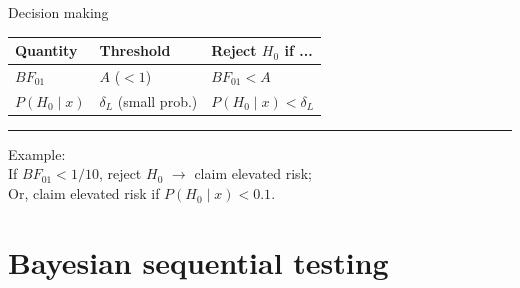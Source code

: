\documentclass[11pt
,fragile=singleslide
,xcolor=dvipsnames
]{beamer}
\begin{document}
	\begin{frame}{Decision making}
		
		\begin{table}
			\centering
			\begin{tabular}{lll}
				\toprule
				Quantity & Threshold & Reject $H_0$ if ... \\
				\midrule
				$BF_{01}$ & $A$ ($< 1$) &   $BF_{01} < A$\\
				$P(H_0 \mid x)$ &  $\delta_L$ (small prob.) & $P(H_0 \mid x) < \delta_L$\\
				\bottomrule
			\end{tabular}
			
		\end{table}
		
	
	\vfill
	\rule{0.6\textwidth}{0.4pt}
	
	\footnotesize{
		Example:\\
		If $BF_{01} < 1/10$, reject $H_0$ $\rightarrow$ claim elevated risk;\\
		Or, claim elevated risk if $P(H_0 \mid x) < 0.1$.
	}
	
	\end{frame}


\section{Bayesian sequential testing}

\end{document}
